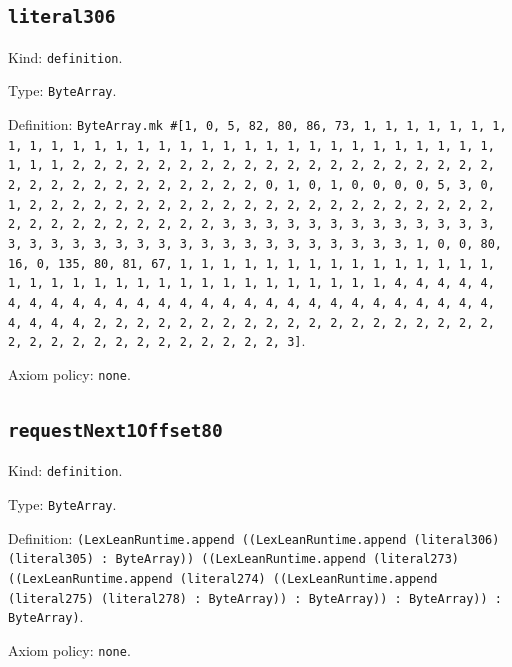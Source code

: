 \documentclass[11pt]{article}
\begin{document}
\subsection*{\texttt{literal306}}
\noindent Kind: \texttt{definition}.\par
\noindent Type: \texttt{ByteArray}.\par
\noindent Definition: \texttt{ByteArray.mk \#[1, 0, 5, 82, 80, 86, 73, 1, 1, 1, 1, 1, 1, 1, 1, 1, 1, 1, 1, 1, 1, 1, 1, 1, 1, 1, 1, 1, 1, 1, 1, 1, 1, 1, 1, 1, 1, 1, 1, 1, 2, 2, 2, 2, 2, 2, 2, 2, 2, 2, 2, 2, 2, 2, 2, 2, 2, 2, 2, 2, 2, 2, 2, 2, 2, 2, 2, 2, 2, 2, 2, 2, 0, 1, 0, 1, 0, 0, 0, 0, 5, 3, 0, 1, 2, 2, 2, 2, 2, 2, 2, 2, 2, 2, 2, 2, 2, 2, 2, 2, 2, 2, 2, 2, 2, 2, 2, 2, 2, 2, 2, 2, 2, 2, 2, 2, 3, 3, 3, 3, 3, 3, 3, 3, 3, 3, 3, 3, 3, 3, 3, 3, 3, 3, 3, 3, 3, 3, 3, 3, 3, 3, 3, 3, 3, 3, 3, 3, 1, 0, 0, 80, 16, 0, 135, 80, 81, 67, 1, 1, 1, 1, 1, 1, 1, 1, 1, 1, 1, 1, 1, 1, 1, 1, 1, 1, 1, 1, 1, 1, 1, 1, 1, 1, 1, 1, 1, 1, 1, 1, 1, 4, 4, 4, 4, 4, 4, 4, 4, 4, 4, 4, 4, 4, 4, 4, 4, 4, 4, 4, 4, 4, 4, 4, 4, 4, 4, 4, 4, 4, 4, 4, 4, 2, 2, 2, 2, 2, 2, 2, 2, 2, 2, 2, 2, 2, 2, 2, 2, 2, 2, 2, 2, 2, 2, 2, 2, 2, 2, 2, 2, 2, 2, 2, 2, 3]}.\par
\noindent Axiom policy: \texttt{none}.\par
\subsection*{\texttt{requestNext1Offset80}}
\noindent Kind: \texttt{definition}.\par
\noindent Type: \texttt{ByteArray}.\par
\noindent Definition: \texttt{(LexLeanRuntime.append ((LexLeanRuntime.append (literal306) (literal305) : ByteArray)) ((LexLeanRuntime.append (literal273) ((LexLeanRuntime.append (literal274) ((LexLeanRuntime.append (literal275) (literal278) : ByteArray)) : ByteArray)) : ByteArray)) : ByteArray)}.\par
\noindent Axiom policy: \texttt{none}.\par
\end{document}
